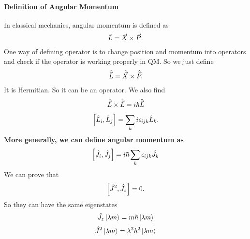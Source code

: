\documentclass[letterpaper,10pt,english]{sphinxmanual}
\newcommand{\ket}[1]{\left| #1\right\rangle}
\begin{document}
\paragraph{Definition of Angular Momentum}
\label{Quantum/QuantumMechanics2:definition-of-angular-momentum}
In classical mechanics, angular momentum is defined as
\begin{gather}
\begin{split}\vec L = \vec X \times \vec P .\end{split}\notag
\end{gather}
One way of defining operator is to change position and momentum into operators and check if the operator is working properly in QM. So we just define
\begin{gather}
\begin{split}\hat {\vec L} = \hat {\vec X}\times \hat{\vec P}.\end{split}\notag
\end{gather}
It is Hermitian. So it can be an operator. We also find
\begin{gather}
\begin{split}\hat{\vec L}\times \hat{\vec L} = i \hbar \hat{\vec L}\end{split}\notag
\end{gather}\begin{gather}
\begin{split}\left[\hat L_i,\hat L_j\right] = \sum_k i\epsilon_{ijk}\hat L_k    .\end{split}\notag
\end{gather}
\textbf{More generally, we can define angular momentum as}
\begin{gather}
\begin{split}\left[\hat J_i, \hat J_j\right] = i\hbar \sum_k \epsilon_{ijk} \hat J_k\end{split}\notag
\end{gather}
We can prove that
\begin{gather}
\begin{split}\left[ \hat J^2,\hat J_z \right] = 0.\end{split}\notag
\end{gather}
So they can have the same eigenstates
\begin{gather}
\begin{split}\hat J_z \ket{\lambda m} = m\hbar \ket{\lambda m}\end{split}\notag
\end{gather}\begin{gather}
\begin{split}\hat J^2 \ket{\lambda m} = \lambda^2 \hbar^2 \ket{\lambda m}\end{split}\notag
\end{gather}
\end{document}
